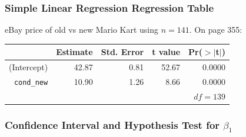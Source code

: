 \documentclass[handout]{beamer}
\newcommand{\blue}[1]{\textcolor{blue2}{#1}}
\begin{document}
\begin{frame}[fragile]
\frametitle{Simple Linear Regression Regression Table}

eBay price of old vs new Mario Kart using $n=141$.  On page 355:

\begin{table}[ht]
\centering
\begin{tabular}{r|rrrr}
  \hline
 & Estimate & Std. Error & t value & Pr($>$$|$t$|$) \\ 
  \hline
(Intercept) & 42.87 & 0.81 & 52.67 & 0.0000 \\ 
{\tt cond\_new} & 10.90 & 1.26 & 8.66 & 0.0000 \\ 
   \hline
   & & & & $df=139$\\
\end{tabular}
\end{table}


\end{frame}


\begin{frame}[fragile]
\frametitle{Confidence Interval and Hypothesis Test for $\beta_1$}
%
%

\end{frame}
\end{document}
